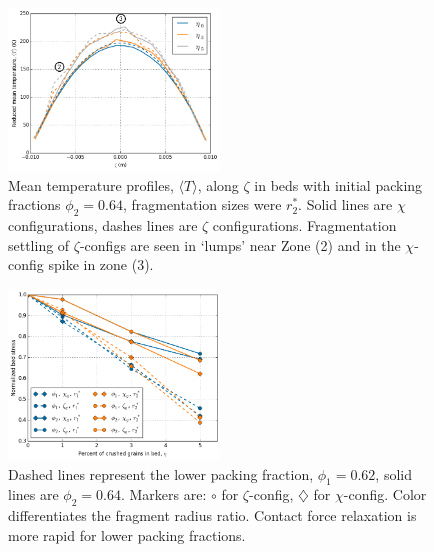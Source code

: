 \begin{figure}[!t]
    \centering
    \includegraphics[width=0.5\textwidth]{figures/64-percent-T-profiles-reduced.png}
    \caption{Mean temperature profiles, $\langle T \rangle$, along $\zeta$ in beds with initial packing fractions $\phi_2 = 0.64$, fragmentation sizes were $r_2^*$. Solid lines are $\chi$ configurations, dashes lines are $\zeta$ configurations. Fragmentation settling of $\zeta$-configs are seen in `lumps' near Zone (2) and in the $\chi$-config spike in zone (3).}
    \label{fig:64-T-profile}
\end{figure}

\begin{figure}[!t]
    \centering
    \includegraphics[width = 0.5\textwidth]{figures/eta-sigma.png}
    \caption{Dashed lines represent the lower packing fraction, $\phi_1 = 0.62$, solid lines are $\phi_2 = 0.64$. Markers are: $\circ$ for $\zeta$-config, $\diamondsuit$ for $\chi$-config. Color differentiates the fragment radius ratio. Contact force relaxation is more rapid for lower packing fractions.}\label{fig:eta-sigma}
\end{figure}

